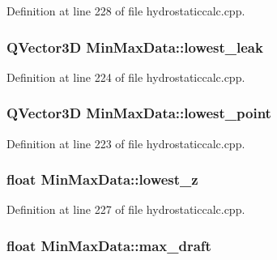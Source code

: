 Definition at line 228 of file hydrostaticcalc.\-cpp.

\hypertarget{structMinMaxData_ab422a9e59c6bb2bc9a28bbb002d5b09f}{
\subsubsection[{lowest\-\_\-leak}]{\setlength{\rightskip}{0pt plus 5cm}Q\-Vector3\-D Min\-Max\-Data\-::lowest\-\_\-leak}}\label{structMinMaxData_ab422a9e59c6bb2bc9a28bbb002d5b09f}


Definition at line 224 of file hydrostaticcalc.\-cpp.

\hypertarget{structMinMaxData_a3d27ad5adf37db4728e700f914bc2ab3}{
\subsubsection[{lowest\-\_\-point}]{\setlength{\rightskip}{0pt plus 5cm}Q\-Vector3\-D Min\-Max\-Data\-::lowest\-\_\-point}}\label{structMinMaxData_a3d27ad5adf37db4728e700f914bc2ab3}


Definition at line 223 of file hydrostaticcalc.\-cpp.

\hypertarget{structMinMaxData_abe1d706394e9836f49ef8cb5dff7bd99}{
\subsubsection[{lowest\-\_\-z}]{\setlength{\rightskip}{0pt plus 5cm}float Min\-Max\-Data\-::lowest\-\_\-z}}\label{structMinMaxData_abe1d706394e9836f49ef8cb5dff7bd99}


Definition at line 227 of file hydrostaticcalc.\-cpp.

\hypertarget{structMinMaxData_a10cf6d95b5b6d24b6b2e874e9fb05362}{
\subsubsection[{max\-\_\-draft}]{\setlength{\rightskip}{0pt plus 5cm}float Min\-Max\-Data\-::max\-\_\-draft}}\label{structMinMaxData_a10cf6d95b5b6d24b6b2e874e9fb05362}


